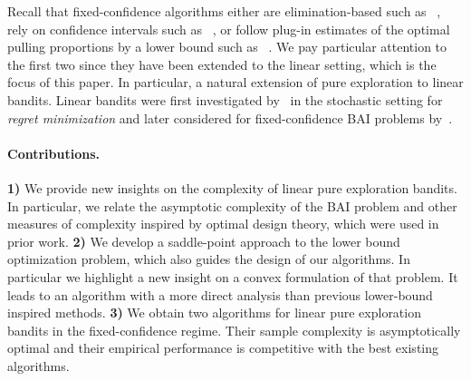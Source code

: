 Recall that fixed-confidence algorithms either are elimination-based such as \SE~\citep{karnin2013sha}, rely on confidence intervals such as \UGapE~\citep{gabillon2012ugape}, or follow plug-in estimates of the optimal pulling proportions by a lower bound such as \Track~\citep{garivier2016tracknstop}. We pay particular attention to the first two since they have been extended to the linear setting, which is the focus of this paper.
In particular, a natural extension of pure exploration to linear bandits. Linear bandits were first investigated by~\citet{auer2002linear} in the stochastic setting for \emph{regret minimization} and later considered for fixed-confidence BAI problems by~\citet{soare2014linear}.


\paragraph{Contributions.}
\textbf{1)}
We provide new insights on the complexity of linear pure exploration bandits. In particular, we relate the asymptotic complexity of the BAI problem and other measures of complexity inspired by optimal design theory, which were used in prior work.
\textbf{2)}
We develop a saddle-point approach to the lower bound optimization problem, which also guides the design of our algorithms. In particular we highlight a new insight on a convex formulation of that problem. It leads to an algorithm with a more direct analysis than previous lower-bound inspired methods.
\textbf{3)}
We obtain two algorithms for linear pure exploration bandits in the fixed-confidence regime. Their sample complexity is asymptotically optimal and their empirical performance is competitive with the best existing algorithms.

%
%
%
